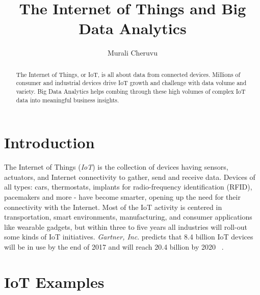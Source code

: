 \documentclass[sigconf]{acmart}
\begin{document}
	\title{The Internet of Things and Big Data Analytics}
	
	
	\author{Murali Cheruvu}
	
	\renewcommand{\shortauthors}{M. Cheruvu}
	
	
	\begin{abstract}
		
		The Internet of Things, or IoT, is all about data from connected devices. Millions of consumer and industrial devices drive IoT growth and challenge with data volume and variety. Big Data Analytics helps combing through these high volumes of complex IoT data into meaningful business insights.
		
	\end{abstract}
	
	
	\maketitle
	

	
	\section{Introduction}	
	
	The Internet of Things ({\em IoT}) is the collection of devices having sensors, actuators, and Internet connectivity to gather, send and receive data. Devices of all types: cars, thermostats, implants for radio-frequency identification (RFID), pacemakers and more - have become smarter, opening up the need for their connectivity with the Internet. Most of the IoT activity is centered in transportation, smart environments, manufacturing, and consumer applications like wearable gadgets, but within three to five years all industries will roll-out some kinds of IoT initiatives. {\em Gartner, Inc}. predicts that 8.4 billion IoT devices will be in use by the end of 2017 and will reach 20.4 billion by 2020 ~\cite{gartner}. 
	
	\section{IoT Examples}
	
\end{document}
